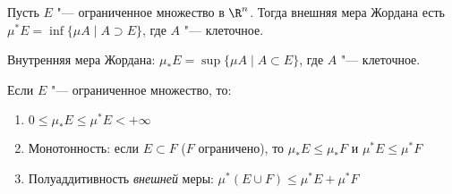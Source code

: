 \begin{Def}
	Пусть $E$ "--- ограниченное множество в $\R^n$.
	Тогда внешняя мера Жордана есть $\mu^* E = \inf \{ \mu A \mid A \supset E \}$, где $A$ "--- клеточное.
\end{Def}
\begin{Def}
	Внутренняя мера Жордана: $\mu_* E = \sup \{ \mu A \mid A \subset E \}$, где $A$ "--- клеточное.
\end{Def}
\begin{theorem}
	Если $E$ "--- ограниченное множество, то:
	\begin{enumerate}
	\item $0 \le \mu_* E \le \mu^* E < +\infty$
	\item
		Монотонность: если $E \subset F$ ($F$ ограничено), то
		$\mu_* E \le \mu_* F$ и $\mu^* E \le \mu^* F$
	\item
		Полуаддитивность \textit{внешней} меры:
		$\mu^* (E \cup F) \le \mu^* E + \mu^* F$
	\end{enumerate}
\end{theorem}
